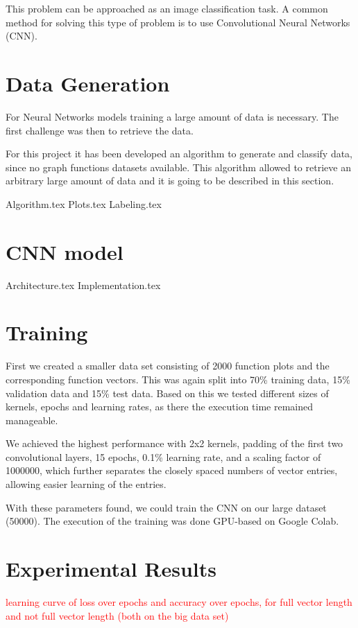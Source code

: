 \documentclass[11pt,a4paper]{scrartcl}
\begin{document}
	This problem can be approached as an image classification task.
	A common method for solving this type of problem is to use Convolutional Neural Networks (CNN).

	\section{Data Generation}
	For Neural Networks models training a large amount of data is necessary. The first challenge was then to retrieve the data.
	
	For this project it has been developed an algorithm to generate and classify data, since no graph functions datasets available. This algorithm allowed to retrieve an arbitrary large amount of data and it is going to be described in this section.
	
	{Algorithm.tex}
	{Plots.tex}
	{Labeling.tex}


	\section{CNN model}
	{Architecture.tex}
	{Implementation.tex}
	
	\section{Training}
	First we created a smaller data set consisting of 2000 function plots and the corresponding function vectors. This was again split into 70\% training data, 15\% validation data and 15\% test data. Based on this we tested different sizes of kernels, epochs and learning rates, as there the execution time remained manageable.
	
	We achieved the highest performance with 2x2 kernels, padding of the first two convolutional layers, 15 epochs, 0.1\% learning rate, and a scaling factor of 1000000, which further separates the closely spaced numbers of vector entries, allowing easier learning of the entries.
	
	With these parameters found, we could train the CNN on our large dataset (50000). The execution of the training was done GPU-based on Google Colab.

	\section{Experimental Results}
	\textcolor{red}{learning curve of loss over epochs and accuracy over epochs, for full vector length and not full vector length (both on the big data set)}
\end{document}
